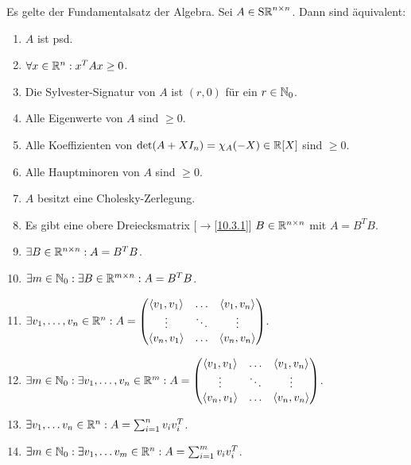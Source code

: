 \documentclass[../../main.tex]{subfiles}
\begin{document}
\begin{sat}\label{14.2.11}
Es gelte der Fundamentalsatz der Algebra. Sei $A\in\operatorname{S\mathbb R}^{n\times n}$. Dann sind äquivalent:
\begin{enumerate}[\normalfont(a)]
\item $A$ ist psd.
\item $\forall x\in \mathbb R^n: x^TAx\ge 0$.
\item Die Sylvester-Signatur von $A$ ist $(r,0)$ für ein $r\in \mathbb N_0$.
\item Alle Eigenwerte von $A$ sind $\ge 0$.
\item Alle Koeffizienten von $\det(A+XI_n)=\chi_A(-X)\in \mathbb R[X]$ sind $\ge 0$.
\item Alle Hauptminoren von $A$ sind $\ge 0$.
\item $A$ besitzt eine Cholesky-Zerlegung.
\item Es gibt eine obere Dreiecksmatrix [$\to$\ref{10.3.1}] $B\in \mathbb R^{n\times n}$ mit $A=B^TB$.
\item $\exists B\in \mathbb R^{n\times n}: A=B^TB$.
\item $\exists m\in \mathbb N_0: \exists B\in \mathbb R^{m\times n}: A=B^TB$.
\item $\exists v_1,\ldots ,v_n\in \R^n: A=\begin{pmatrix*}\scal{v_1,v_1}&\hdots&\scal{v_1,v_n}\\\vdots &\ddots&\vdots\\ \scal{v_n,v_1}&\hdots&\scal{v_n,v_n}\end{pmatrix*}$.
\item $\exists m\in \N_0:\exists v_1,\ldots ,v_n\in \R^m: A=\begin{pmatrix*}\scal{v_1,v_1}&\hdots&\scal{v_1,v_n}\\\vdots&\ddots&\vdots\\ \scal{v_n,v_1}&\hdots&\scal{v_n,v_n}\end{pmatrix*}$.
\item $\exists v_1,\ldots v_n\in \mathbb R^n: A=\sum_{i=1}^n v_iv_i^T$.
\item $\exists m\in \mathbb N_0:\exists v_1,\ldots v_m\in \mathbb R^n: A=\sum_{i=1}^m v_iv_i^T$.
\end{enumerate}	 
\end{sat}
\end{document}
